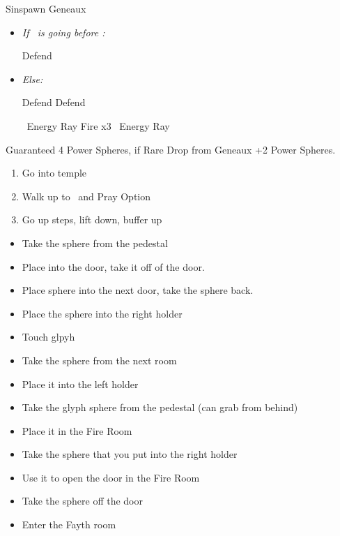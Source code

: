 \begin{battle}[3000]{Sinspawn Geneaux}
    \begin{itemize}
        \item \textit{If \tidus\ is going before \yuna:}
        \begin{itemize}
            \tidusf Defend
        \end{itemize}
        \item \textit{Else:}
        \begin{itemize}
            \switch{\yuna}{\wakka}
            \wakkaf Defend
            \tidusf Defend
            \switch{\lulu}{\yuna}
        \end{itemize}
        \summon{\valefor}
        \valeforf \od\ Energy Ray
        \valeforf Fire x3
        \valeforf \od\ Energy Ray
    \end{itemize}
    Guaranteed 4 Power Spheres, if Rare Drop from Geneaux +2 Power Spheres.
\end{battle}
\begin{enumerate}[resume]
    \item Go into temple
    \item Walk up to \wakka\ and Pray  Option
    \item Go up steps, lift down, buffer up
\end{enumerate}
\begin{trial}
    \begin{itemize}
        \item Take the sphere from the pedestal
        \item Place into the door, take it off of the door.
        \item Place sphere into the next door, take the sphere back.
        \item Place the sphere into the right holder
        \item Touch glpyh
        \item Take the sphere from the next room
        \item Place it into the left holder
        \item Take the glyph sphere from the pedestal (can grab from behind)
        \item Place it in the Fire Room
        \item Take the sphere that you put into the right holder
        \item Use it to open the door in the Fire Room
        \item Take the sphere off the door
        \item Enter the Fayth room
    \end{itemize}
\end{trial}

